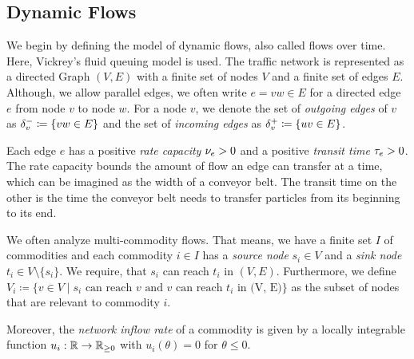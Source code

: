 \subsection{Dynamic Flows}\label{subsec:dynamic-flows}

We begin by defining the model of dynamic flows, also called flows over time.
Here, Vickrey's fluid queuing model is used. 
The traffic network is represented as a directed Graph $(V, E)$ with a finite set of nodes $V$ and a finite set of edges $E$.
Although, we allow parallel edges, we often write $e=vw\in E$ for a directed edge $e$ from node $v$ to node $w$.
For a node $v$, we denote the set of \emph{outgoing edges} of $v$ as $\delta^-_{v}\coloneqq \{ vw \in E \}$ and the set of \emph{incoming edges} as $\delta^+_{v} \coloneqq \{ uv \in E \}$.

Each edge $e$ has a positive \emph{rate capacity} $\nu_e > 0$ and a positive \emph{transit time} $\tau_e > 0$.
The rate capacity bounds the amount of flow an edge can transfer at a time, which can be imagined as the width of a conveyor belt.
The transit time on the other is the time the conveyor belt needs to transfer particles from its beginning to its end.

We often analyze multi-commodity flows.
That means, we have a finite set $I$ of commodities and each commodity $i\in I$ has a \emph{source node} $s_i\in V$ and a \emph{sink node} $t_i\in V\setminus\{ s_i \}$.
We require, that $s_i$ can reach $t_i$ in $(V,E)$.
Furthermore, we define $V_i \coloneqq \{ v \in V \mid \text{$s_i$ can reach $v$ and $v$ can reach $t_i$ in (V, E)} \}$ as the subset of nodes that are relevant to commodity $i$.

Moreover, the \emph{network inflow rate} of a commodity is given by a locally integrable function $u_i:\mathbb{R} \rightarrow \mathbb{R}_{\geq 0}$ with $u_i(\theta) = 0$ for $\theta \leq 0$.

